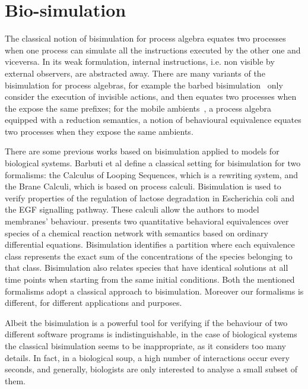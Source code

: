 \section{Bio-simulation}
\label{sec:biosimulation}

The classical notion of bisimulation for process algebra equates two processes
when one process can simulate all the instructions executed by the other one and viceversa.
In its weak formulation, internal instructions, i.e. non visible by external observers,
are abstracted away. 
There are many variants of the bisimulation for process algebras,  for example the
barbed bisimulation~\cite{10.1007/3-540-55719-9_114} only consider the execution of invisible actions, and then equates two processes when the expose the same prefixes; for the mobile ambients~\cite{CardelliG00}, a process algebra equipped with a reduction semantics, a notion of
behavioural equivalence equates two processes when they expose the same ambients\cite{GC03}. 

There are some previous works based on bisimulation applied to models for biological systems. Barbuti et al \cite{BMMT08} define a classical setting for bisimulation for two formalisms: the Calculus of Looping Sequences, which is a rewriting system, and the Brane Calculi, which is based on process calculi.
Bisimulation is used to verify properties of the regulation of lactose degradation in
Escherichia coli and the EGF signalling pathway. These calculi allow the authors to model membranes' behaviour.
\cite{CTTV15} presents two quantitative behavioral equivalences over species of a 
chemical reaction network with semantics based on ordinary differential equations.
Bisimulation identifies a partition where each equivalence class represents the exact sum of the concentrations of the species belonging to that class.
Bisimulation also relates species that have identical solutions at all time points when starting from the same initial conditions.
Both the mentioned formalisms \cite{BMMT08,CTTV15} adopt a classical approach to bisimulation. Moreover our formalisms is different, for different applications and purposes. 

Albeit the bisimulation is a powerful tool for verifying if the behaviour of two different software 
programs is indistinguishable, in the case of biological systems the classical bisimulation seems to be inappropriate, as it considers too many details.
In fact, in a biological soup, a high number of interactions occur every seconds, and generally, biologists
are only interested to analyse a small subset of them.

